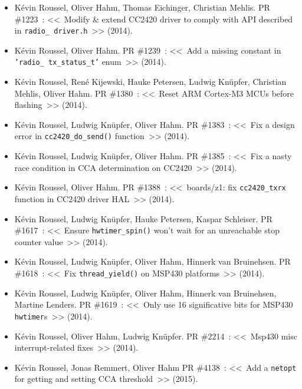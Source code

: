 \documentclass[10pt,c]{beamer}
\begin{document}
\begin{frame}[allowframebreaks]
\begin{itemize}
(2014).
\item Kévin Roussel, Oliver Hahm, Thomas Eichinger, Christian Mehlis.
PR \#1223~: <<~Modify \& extend CC2420 driver to comply with API described
               in \texttt{radio\_ driver.h}~>>
(2014).
\item Kévin Roussel, Oliver Hahm.
PR \#1239~: <<~Add a missing constant in \texttt{'radio\_ tx\_status\_t'}
               enum~>>
(2014).
\item Kévin Roussel, René Kijewski, Hauke Petersen, Ludwig Knüpfer,
      Christian Mehlis, Oliver Hahm.
PR \#1380~: <<~Reset ARM Cortex-M3 MCUs before flashing~>>
(2014).
\item Kévin Roussel, Ludwig Knüpfer, Oliver Hahm.
PR \#1383~: <<~Fix a design error in \texttt{cc2420\_do\_send()} function~>>
(2014).
\item Kévin Roussel, Ludwig Knüpfer, Oliver Hahm.
PR \#1385~: <<~Fix a nasty race condition in CCA determination on CC2420~>>
(2014).
\item Kévin Roussel, Oliver Hahm.
PR \#1388~: <<~boards/z1: fix \texttt{cc2420\_txrx} function in CC2420
               driver HAL~>>
(2014).
\item Kévin Roussel, Ludwig Knüpfer, Hauke Petersen, Kaspar Schleiser.
PR \#1617~: <<~Ensure \texttt{hwtimer\_spin()} won't wait for
               an unreachable stop counter value~>>
(2014).
\item Kévin Roussel, Ludwig Knüpfer, Oliver Hahm, Hinnerk van Bruinehsen.
PR \#1618~: <<~Fix \texttt{thread\_yield()} on MSP430 platforms~>>
(2014).
\item Kévin Roussel, Ludwig Knüpfer, Oliver Hahm, Hinnerk van Bruinehsen,
      Martine Lenders.
PR \#1619~: <<~Only use 16 significative bits for MSP430 \texttt{hwtimer}s~>>
(2014).
\item Kévin Roussel, Oliver Hahm, Ludwig Knüpfer.
PR \#2214~: <<~Msp430 misc interrupt-related fixes~>>
(2014).
\item Kévin Roussel, Jonas Remmert, Oliver Hahm
PR \#4138~: <<~Add a \texttt{netopt} for getting and setting CCA threshold~>>
(2015).

\end{itemize}
\end{frame}




\section*{}

\begin{frame}


\end{frame}


\end{document}
